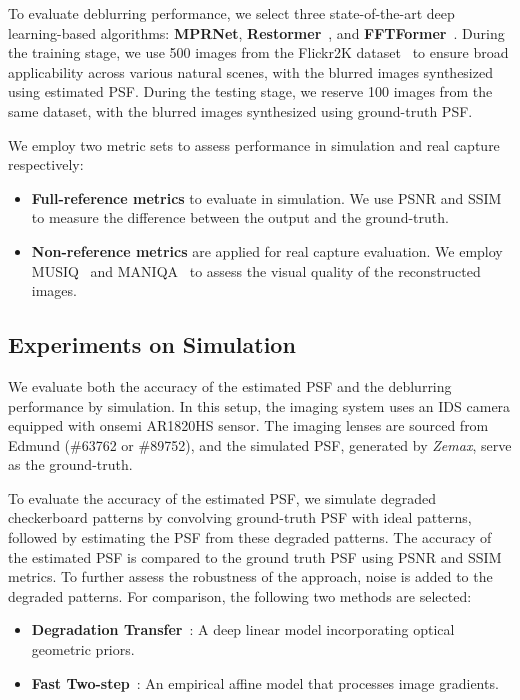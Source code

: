 To evaluate deblurring performance, we select three state-of-the-art deep learning-based algorithms: \textbf{MPRNet}\cite{zamir2021multi}, \textbf{Restormer}~\cite{zamir2022restormer}, and \textbf{FFTFormer}~\cite{kong2023efficient}. During the training stage, we use 500 images from the Flickr2K dataset~\cite{lim2017enhanced} to ensure broad applicability across various natural scenes, with the blurred images   synthesized using estimated PSF. During the testing stage, we reserve 100 images from the same dataset, with the blurred images synthesized using ground-truth PSF.

We employ two metric sets to assess performance in simulation and real capture respectively:

\begin{itemize}
    \item \textbf{Full-reference metrics} to evaluate in simulation. We use PSNR and SSIM~\cite{wang2004image} to measure the difference between the output and the ground-truth.
    \item \textbf{Non-reference metrics} are applied for real capture evaluation. We employ MUSIQ~\cite{ke2021musiq} and MANIQA~\cite{yang2022maniqa} to assess the visual quality of the reconstructed images.
\end{itemize}


\subsection{Experiments on Simulation}
We evaluate both the accuracy of the estimated PSF and the deblurring performance by simulation. In this setup, the imaging system uses an IDS camera equipped with onsemi AR1820HS sensor. The imaging lenses are sourced from Edmund (\#63762 or \#89752), and the simulated PSF, generated by \textit{Zemax}\textsuperscript{\textregistered}, serve as the ground-truth. 

To evaluate the accuracy of the estimated PSF, we simulate degraded checkerboard patterns by convolving ground-truth PSF with ideal patterns, followed by estimating the PSF from these degraded patterns. The accuracy of the estimated PSF is compared to the ground truth PSF using PSNR and SSIM metrics. To further assess the robustness of the approach, noise is added to the degraded patterns. For comparison, the following two methods are selected:

\begin{itemize}
\item \textbf{Degradation Transfer}~\cite{chen2021extreme}: A deep linear model incorporating optical geometric priors.
\item \textbf{Fast Two-step}~\cite{eboli2022fast}: An empirical affine model that processes image gradients.
\end{itemize}

